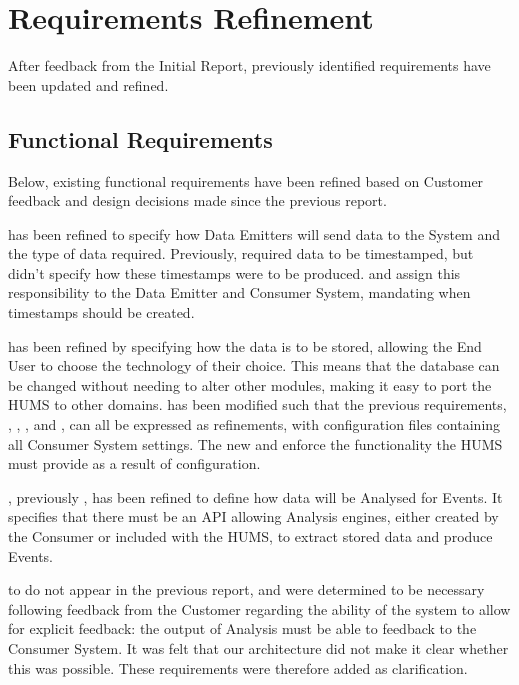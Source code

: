 \section{Requirements Refinement}
\label{sec:requirements}
After feedback from the Initial Report, previously identified requirements have been updated and refined.

\subsection{Functional Requirements}
\label{sec:requirements-functional}
Below, existing functional requirements have been refined based on Customer 
feedback and design decisions made since the previous report.

 has been refined to specify how Data Emitters will send data to the System 
and the type of data required. Previously,
 required data to be timestamped, but didn't specify how these 
timestamps were to be produced.  and  assign this
responsibility to the Data Emitter and Consumer System, mandating when 
timestamps should be created.

 has been refined by specifying how the data is to be stored, allowing the End 
User to choose the technology of their choice. This means that the database can be 
changed without needing to alter other modules, making it easy to 
port the HUMS to other domains.
 has been modified such that the previous requirements, , , 
, and , can all be expressed as refinements, with 
configuration files containing all Consumer System settings. The new  and  
enforce the functionality the HUMS must provide as a result of configuration.

, previously , has been refined to define how data will be Analysed for 
Events. It specifies that there must be an API allowing Analysis engines, 
either created by the Consumer or included with the HUMS, to extract stored data
and produce Events. 

 to  do not appear in the previous report, and were determined 
to be necessary following feedback from the Customer regarding the ability 
of the system to allow for explicit feedback: the output of Analysis must be able to feedback to the Consumer System. 
It was felt that our architecture did not make it clear whether this was 
possible. These requirements were therefore added as clarification.

